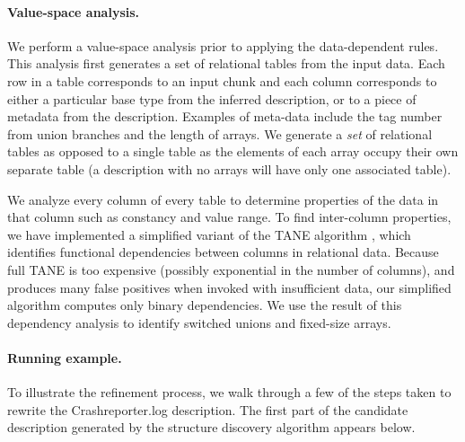 \paragraph*{Value-space analysis.}
We perform a value-space analysis prior
to applying the data-dependent rules.
This analysis first generates a set of relational tables from the input data.
Each row in a table corresponds to an input chunk and each column
corresponds to either a particular base type from the inferred description,
or to a piece of metadata from the description.  Examples of meta-data
include the tag number from union branches and the length of arrays.
We generate a {\em set} of relational tables as opposed to a single table
as the elements of each array occupy their own separate table (a description 
with no arrays will have only one associated table).

We analyze every column of every table to determine properties of the
data in that column such as constancy and value range. 
To find inter-column properties, we have implemented a simplified
variant of the TANE algorithm \cite{TANE-HKPT99},
which identifies functional dependencies between columns in 
relational data.  Because full TANE is too expensive
(possibly exponential in the number of columns), 
and produces many false positives when invoked with insufficient data,
our simplified algorithm computes only binary dependencies. We use the 
result of this dependency analysis to identify switched unions and
fixed-size arrays. 

\paragraph*{Running example.}
To illustrate the refinement process, we walk through a few of the
steps taken to rewrite the 
Crashreporter.log description.  The first part of the
candidate description generated by the structure discovery algorithm
appears below.

